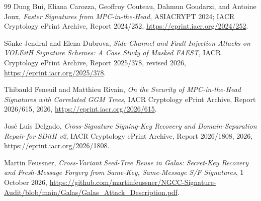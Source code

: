 \documentclass[11pt,a4paper]{article}
\begin{document}
\begin{thebibliography}{99}
Dung Bui, Eliana Carozza, Geoffroy Couteau, Dahmun Goudarzi, and Antoine Joux,
\emph{Faster Signatures from MPC-in-the-Head},
ASIACRYPT 2024; IACR Cryptology ePrint Archive, Report 2024/252,
\url{https://eprint.iacr.org/2024/252}.

S\"onke Jendral and Elena Dubrova,
\emph{Side-Channel and Fault Injection Attacks on VOLEitH Signature
Schemes: A Case Study of Masked FAEST},
IACR Cryptology ePrint Archive, Report 2025/378, revised 2026,
\url{https://eprint.iacr.org/2025/378}.

Thibauld Feneuil and Matthieu Rivain,
\emph{On the Security of MPC-in-the-Head Signatures with Correlated GGM
Trees}, IACR Cryptology ePrint Archive, Report 2026/615, 2026,
\url{https://eprint.iacr.org/2026/615}.

Jos\'e Luis Delgado,
\emph{Cross-Signature Signing-Key Recovery and Domain-Separation Repair for
SDitH v2}, IACR Cryptology ePrint Archive, Report 2026/1808, 2026,
\url{https://eprint.iacr.org/2026/1808}.

Martin Feussner,
\emph{Cross-Variant Seed-Tree Reuse in Galas: Secret-Key Recovery and
Fresh-Message Forgery from Same-Key, Same-Message S/F Signatures},
1 October 2026,
\url{https://github.com/martinfeussner/NGCC-Signature-Audit/blob/main/Galas/Galas_Attack_Description.pdf}.

\end{thebibliography}
\end{document}
